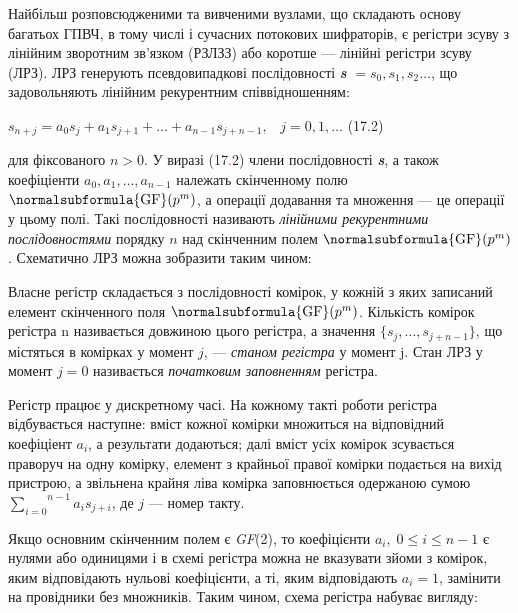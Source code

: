 Найбільш розповсюдженими та вивченими вузлами, що складають основу багатьох
ГПВЧ, в тому числі і сучасних потокових шифраторів, є регістри зсуву з лінійним
зворотним зв’язком (РЗЛЗЗ) або коротше --- лінійні регістри зсуву (ЛРЗ). ЛРЗ
генерують псевдовипадкові послідовності \textbf{\textit{s}}
${=s_{{0}},s_{{1}},s_{{2}}\dots}$, що задовольняють лінійним
рекурентним співвідношенням:

{\raggedleft

${s_{{n+j}}=a_{{0}}s_{{j}}+a_{{1}}s_{{j+1}}+\dots+a_{{n-1}}s_{{j+n-1}},\;\;\;j=0,1,\dots}$
 (17.2)
\par}

для фіксованого  ${n>0}$. У виразі (17\textcolor{red}{.}2) члени послідовності
\textbf{\textit{s}}, а також коефіціенти 
${a_{{0}},a_{{1}},\dots,a_{{n-1}}}$ належать скінченному
полю  ${\normalsubformula{\text{GF}}(p^{{m}})}$, а операції додавання та
множення --- це операції у цьому полі. Такі послідовності називають
\textit{лінійними рекурентними послідовностями} порядку  ${n}$ над скінченним
полем  ${\normalsubformula{\text{GF}}(p^{{m}})}$. Схематично ЛРЗ можна
зобразити таким чином:

{\par}


\bigskip

Власне регістр складається з послідовності комірок, у кожній з яких записаний
елемент скінченного поля  ${\normalsubformula{\text{GF}}(p^{{m}})}$. Кількість
комірок регістра n називається довжиною цього регістра, а значення 
${\{s_{{j}},\dots,s_{{j+n-1}}\}}$, що містяться в комірках у
момент  ${j}$, ---  \textit{станом регістра} у момент j. Стан ЛРЗ у момент 
${j=0}$ називається \textit{початковим заповненням}\textbf{ }регістра.

Регістр працює у дискретному часі. На кожному такті роботи регістра відбувається
наступне: вміст кожної комірки множиться на відповідний коефіціент 
${a_{{i}}}$, а результати додаються; далі вміст усіх комірок зсувається
праворуч на одну комірку, елемент з крайньої правої комірки подається на вихід
пристрою, а звільнена крайня ліва комірка заповнюється одержаною сумою 
${\overset{{n-1}}{\underset{{i=0}}{\sum }}{a_{{i}}s_{{j+i}}}}$, де  ${j}$ ---
номер такту.

Якщо основним скінченним полем є \textit{GF}(2), то коефіцієнти 
${a_{{i}},\;0\le i\le n-1}$ є нулями або одиницями і в схемі регістра можна не
вказувати зйоми з комірок, яким відповідають нульові коефіцієнти, а ті, яким
відповідають  ${a_{{i}}=1}$, замінити на провідники без множників. Таким чином,
схема регістра набуває вигляду:


